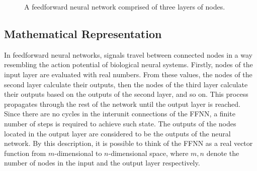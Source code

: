 \begin{figure}[ht]
	\centering
	\scriptsize
	\caption[A feedforward neural network.]{A feedforward neural network comprised of three layers of nodes.}
	\label{fig:FFNN}
\end{figure}

\subsection{Mathematical Representation}
In feedforward neural networks, signals travel between connected nodes in a way resembling the action potential of biological neural systems. Firstly, nodes of the input layer are evaluated with real numbers. From these values, the nodes of the second layer calculate their outputs, then the nodes of the third layer calculate their outputs based on the outputs of the second layer, and so on. This process propagates through the rest of the network until the output layer is reached. Since there are no cycles in the interunit connections of the FFNN, a finite number of steps is required to achieve such state. The outputs of the nodes located in the output layer are considered to be the outputs of the neural network. By this description, it is possible to think of the FFNN as a real vector function from $m$-dimensional to $n$-dimensional space, where $m,n$ denote the number of nodes in the input and the output layer respectively.

